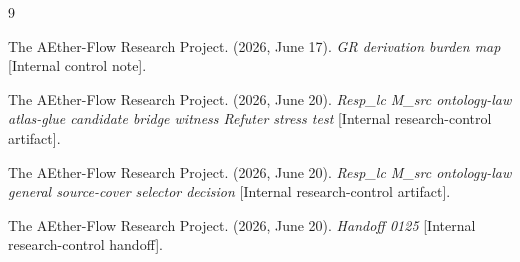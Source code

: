 \documentclass[11pt]{article}
\begin{document}
\begin{thebibliography}{9}

The AEther-Flow Research Project. (2026, June 17). \emph{GR derivation burden
map} [Internal control note].

The AEther-Flow Research Project. (2026, June 20). \emph{Resp\_lc M\_src
ontology-law atlas-glue candidate bridge witness Refuter stress test}
[Internal research-control artifact].

The AEther-Flow Research Project. (2026, June 20). \emph{Resp\_lc M\_src
ontology-law general source-cover selector decision} [Internal research-control
artifact].

The AEther-Flow Research Project. (2026, June 20). \emph{Handoff 0125}
[Internal research-control handoff].

\end{thebibliography}
\end{document}
